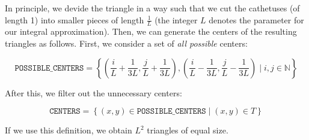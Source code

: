 \documentclass{article}
\begin{document}
In principle, we devide the triangle in a way such that we cut the cathetuses (of length 1) into smaller pieces of length $\frac{1}{L}$ (the integer $L$ denotes the parameter for our integral approximation). Then, we can generate the centers of the resulting triangles as follows. First, we consider a set of \emph{all possible} centers:

\begin{equation*}
  \mathtt{POSSIBLE\_CENTERS} = \left\{
    \left(\frac{i}{L} + \frac{1}{3L}, \frac{j}{L} + \frac{1}{3L}\right) ,
    \left(\frac{i}{L} - \frac{1}{3L}, \frac{j}{L} - \frac{1}{3L}\right)
    \mid
    i, j\in \mathbb{N}
  \right\}
\end{equation*}

After this, we filter out the unnecessary centers:

\begin{equation*}
  \mathtt{CENTERS} = \left\{
    (x,y)\in \mathtt{POSSIBLE\_CENTERS}
    \mid
    (x,y) \in T
  \right\}
\end{equation*}

If we use this definition, we obtain $L^2$ triangles of equal size.
\end{document}

